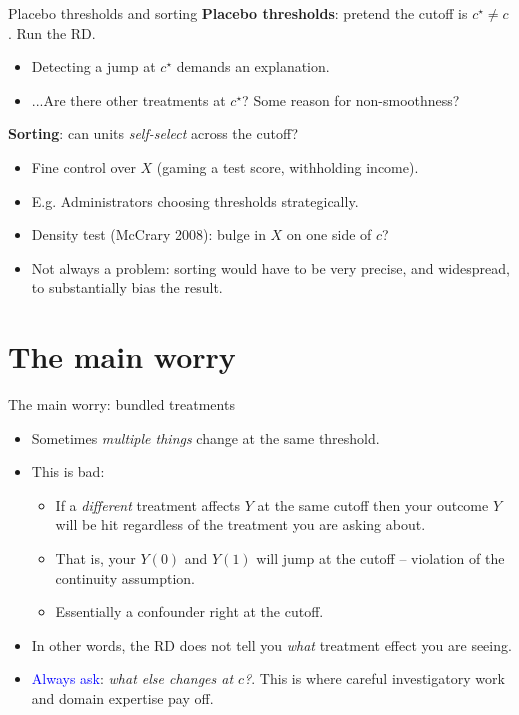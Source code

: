 \documentclass[xcolor=dvipsnames]{beamer}
\begin{document}
\begin{frame}{Placebo thresholds and sorting}
\small
{} \textbf{Placebo thresholds}: pretend the cutoff is $c^\star \neq c$. Run the RD. \\
\smallskip
\begin{itemize}
  \footnotesize
  \item Detecting a jump at $c^\star$ demands an explanation.
  \item ...Are there other treatments at $c^\star$? Some reason for non-smoothness?
\end{itemize}
\bigskip
{} \textbf{Sorting}: can units \textit{self-select} across the cutoff?
\smallskip
\begin{itemize}
  \footnotesize
  \item Fine control over $X$ (gaming a test score, withholding income).
  \item E.g. Administrators choosing thresholds strategically.
  \item Density test (McCrary 2008): bulge in $X$ on one side of $c$?
  \item Not always a problem: sorting would have to be very precise, and widespread, to substantially bias the result.
\end{itemize}
\end{frame}


\section{The main worry}

\begin{frame}{The main worry: bundled treatments}
\small
\begin{itemize}
\item<1-> Sometimes \textit{multiple things} change at the same threshold.
\medskip
\item<2-> This is bad:
\begin{itemize}
  \footnotesize
  \item If a \textit{different} treatment affects $Y$ at the same cutoff then your outcome $Y$ will be hit regardless of the treatment you are asking about.
  \item That is, your $Y(0)$ and $Y(1)$ will jump at the cutoff -- violation of the continuity assumption.
  \item Essentially a confounder right at the cutoff.
\end{itemize}
\medskip
\item<3-> In other words, the RD does not tell you \textit{what} treatment effect you are seeing.
\medskip
\item<4-> \textcolor{Blue}{Always ask}: \textit{what else changes at $c$?}. This is where careful investigatory work and domain expertise pay off.
\end{itemize}
\end{frame}
\end{document}
